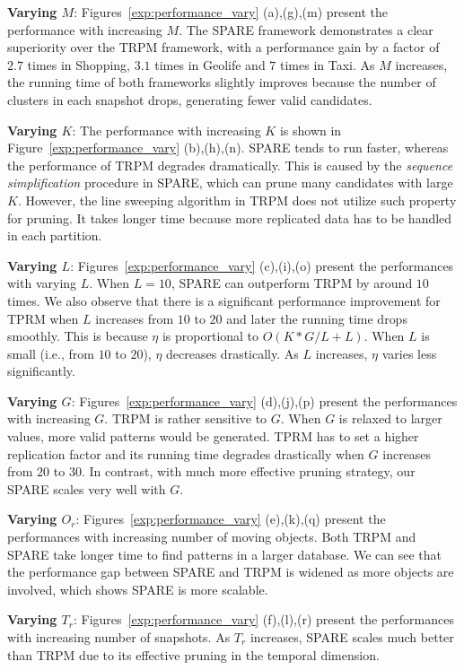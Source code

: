 \textbf{Varying $M$}: Figures~\ref{exp:performance_vary} (a),(g),(m)
present the performance with increasing $M$. The SPARE framework demonstrates a clear superiority over the TRPM framework, with 
a performance gain by a factor of  $2.7$ times in Shopping, $3.1$ times in Geolife and
$7$ times in Taxi. As $M$ increases, the running time of both frameworks slightly improves because the number of clusters in each snapshot drops, generating fewer valid candidates.

\textbf{Varying $K$}: The performance with increasing $K$ is shown in Figure~\ref{exp:performance_vary} (b),(h),(n).  SPARE tends to run faster, whereas the performance of TRPM degrades dramatically. This is caused by the \emph{sequence simplification} procedure in SPARE, which can prune many candidates with large $K$. However, the line sweeping algorithm in TRPM does not utilize such property for pruning. It takes longer time because more replicated data has to be handled in each partition.

\textbf{Varying $L$}: Figures~\ref{exp:performance_vary} (c),(i),(o) present the performances with varying $L$. When $L=10$, SPARE can outperform TRPM by around $10$ times. We also observe that there is a significant performance improvement for TPRM when $L$ increases from $10$ to $20$ and later the running time drops smoothly. 
This is because $\eta$ is proportional to $O(K*G/L+L)$. When $L$ is small (i.e., from $10$ to $20$),
$\eta$ decreases drastically. As $L$ increases, $\eta$ varies less significantly.

\textbf{Varying $G$}: Figures~\ref{exp:performance_vary} (d),(j),(p) present the performances with increasing $G$.  TRPM is rather sensitive to $G$. When $G$ is relaxed to larger values, more valid patterns would be generated. TPRM has to set a higher replication factor and its running time degrades drastically when $G$ increases from $20$ to $30$. In contrast, with much more effective pruning strategy, our SPARE scales very well with $G$.

\textbf{Varying $O_r$}: Figures~\ref{exp:performance_vary} (e),(k),(q) present 
the performances with increasing number of moving objects. Both TRPM and SPARE take longer time to find patterns in a larger database. We can see that the performance gap between SPARE and TRPM is widened as more objects are involved, which shows SPARE is more scalable.

\textbf{Varying $T_r$}: Figures~\ref{exp:performance_vary} (f),(l),(r) present 
the performances with increasing number of snapshots. As $T_r$ increases, SPARE scales much better than TRPM due to its effective pruning in the temporal dimension. 

